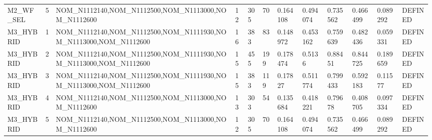 \begin{table}[ht]
\begin{tabular}{llllllllllll}
M2\_WF\_SEL & 5 & NOM\_N1112140,NOM\_N1112500,NOM\_N1113000,NOM\_N1112600 & 12 & 305 & 70 & 0.164108 & 0.494074 & 0.735562 & 0.466499 & 0.089292 & DEFINED \\
M3\_HYBRID & 1 & NOM\_N1112140,NOM\_N1112500,NOM\_N1111930,NOM\_N1113000,NOM\_N1112600 & 16 & 383 & 83 & 0.148972 & 0.453162 & 0.759639 & 0.482436 & 0.059331 & DEFINED \\
M3\_HYBRID & 2 & NOM\_N1112140,NOM\_N1112500,NOM\_N1111930,NOM\_N1113000,NOM\_N1112600 & 15 & 455 & 199 & 0.178474 & 0.5136 & 0.88451 & 0.844725 & 0.189659 & DEFINED \\
M3\_HYBRID & 3 & NOM\_N1112140,NOM\_N1112500,NOM\_N1111930,NOM\_N1113000,NOM\_N1112600 & 15 & 383 & 119 & 0.17827 & 0.511774 & 0.799433 & 0.592183 & 0.11577 & DEFINED \\
M3\_HYBRID & 4 & NOM\_N1112140,NOM\_N1112500,NOM\_N1113000,NOM\_N1112600 & 13 & 303 & 54 & 0.135684 & 0.418221 & 0.79678 & 0.408705 & 0.097334 & DEFINED \\
M3\_HYBRID & 5 & NOM\_N1112140,NOM\_N1112500,NOM\_N1113000,NOM\_N1112600 & 12 & 305 & 70 & 0.164108 & 0.494074 & 0.735562 & 0.466499 & 0.089292 & DEFINED \\
\bottomrule
\end{tabular}
\end{table}
